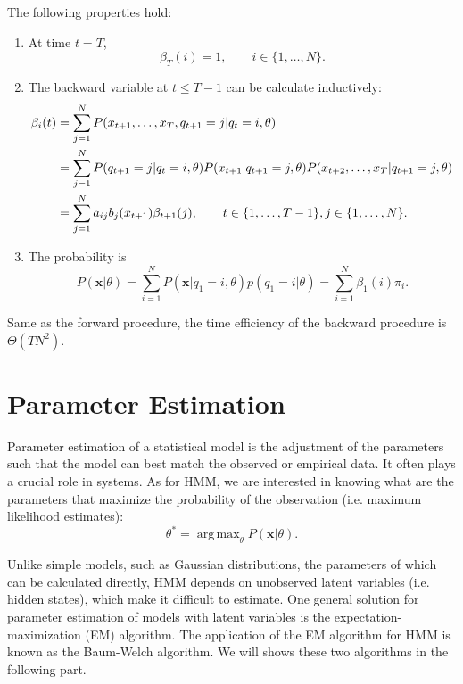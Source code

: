 \documentclass[12pt,final,twoside]{report}
\theoremstyle{plain}
\theoremstyle{definition}
\theoremstyle{remark}
\DeclareMathOperator*{\argmax}{arg\,max}
\begin{document}
The following properties hold:
\begin{enumerate}
  \item At time $t = T$,
    \begin{equation}
      \beta_T(i) = 1, \qquad i \in \{1,\dots,N\} .
    \end{equation}
  \item The backward variable at $t \leq T - 1$ can be calculate inductively:
    \begin{align}
      \beta_i(t) &= \sum_{j=1}^{N} P(x_{t+1},\dots,x_T,q_{t+1}=j|q_t=i,\theta) \notag\\
      &= \sum_{j=1}^{N} P(q_{t+1}=j|q_t=i,\theta) P(x_{t+1}|q_{t+1}=j,\theta) P(x_{t+2},\dots,x_T|q_{t+1}=j,\theta) \notag\\
      &= \sum_{j=1}^{N} a_{ij} b_j(x_{t+1}) \beta_{t+1}(j) , \qquad t \in \{1,\dots,T - 1\}, j \in \{1,\dots,N\} .
    \end{align}
  \item The probability is
    \begin{equation}
      P(\mathbf{x}|\theta) = \sum_{i=1}^N P(\mathbf{x}|q_1=i,\theta) p(q_1=i|\theta) = \sum_{i=1}^N \beta_1(i) \pi_i .
    \end{equation}
\end{enumerate}

Same as the forward procedure, the time efficiency of the backward procedure is $\Theta(TN^2)$.

\section{Parameter Estimation}
Parameter estimation of a statistical model is the adjustment of the parameters such that the model can best match the observed or empirical data. It often plays a crucial role in systems. As for HMM, we are interested in knowing what are the parameters that maximize the probability of the observation (i.e. maximum likelihood estimates):
\begin{equation}
  \theta^* = \argmax_{\theta} P(\mathbf{x}|\theta) .
\end{equation}

Unlike simple models, such as Gaussian distributions, the parameters of which can be calculated directly, HMM depends on unobserved latent variables (i.e. hidden states), which make it difficult to estimate. One general solution for parameter estimation of models with latent variables is the expectation-maximization (EM) algorithm. The application of the EM algorithm for HMM is known as the Baum-Welch algorithm. We will shows these two algorithms in the following part.
\end{document}
